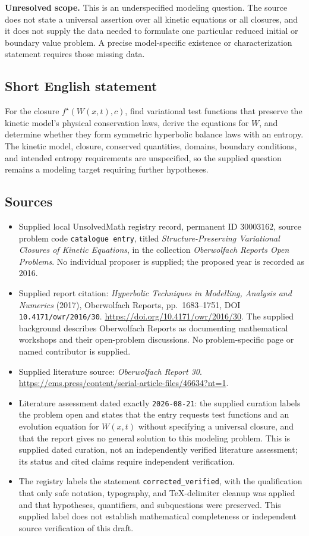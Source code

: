 \documentclass[11pt]{article}
\begin{document}
\textbf{Unresolved scope.} This is an underspecified modeling question. The source does not state a universal assertion over all kinetic equations or all closures, and it does not supply the data needed to formulate one particular reduced initial or boundary value problem. A precise model-specific existence or characterization statement requires those missing data.
\subsection{Short English statement}
For the closure \(f^{\star}(W(x,t),c)\), find variational test functions that preserve the kinetic model's physical conservation laws, derive the equations for \(W\), and determine whether they form symmetric hyperbolic balance laws with an entropy. The kinetic model, closure, conserved quantities, domains, boundary conditions, and intended entropy requirements are unspecified, so the supplied question remains a modeling target requiring further hypotheses.
\subsection{Sources}
\begin{itemize}
\item Supplied local UnsolvedMath registry record, permanent ID \(30003162\), source problem code \texttt{catalogue entry}, titled \emph{Structure-Preserving Variational Closures of Kinetic Equations}, in the collection \emph{Oberwolfach Reports Open Problems}. No individual proposer is supplied; the proposed year is recorded as 2016.
\item Supplied report citation: \emph{Hyperbolic Techniques in Modelling, Analysis and Numerics} (2017), Oberwolfach Reports, pp.\ 1683--1751, DOI \texttt{10.4171/owr/2016/30}. \url{https://doi.org/10.4171/owr/2016/30}. The supplied background describes Oberwolfach Reports as documenting mathematical workshops and their open-problem discussions. No problem-specific page or named contributor is supplied.
\item Supplied literature source: \emph{Oberwolfach Report 30}. \url{https://ems.press/content/serial-article-files/46634?nt=1}.
\item Literature assessment dated exactly \texttt{2026-08-21}: the supplied curation labels the problem open and states that the entry requests test functions and an evolution equation for \(W(x,t)\) without specifying a universal closure, and that the report gives no general solution to this modeling problem. This is supplied dated curation, not an independently verified literature assessment; its status and cited claims require independent verification.
\item The registry labels the statement \texttt{corrected\_verified}, with the qualification that only safe notation, typography, and TeX-delimiter cleanup was applied and that hypotheses, quantifiers, and subquestions were preserved. This supplied label does not establish mathematical completeness or independent source verification of this draft.
\end{itemize}
\end{document}
